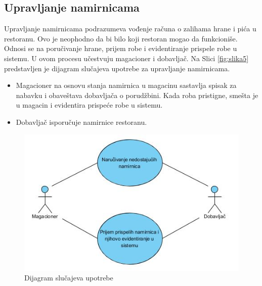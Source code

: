  \subsection{Upravljanje namirnicama}
 Upravljanje namirnicama podrazumeva vođenje računa o zalihama hrane i pića u restoranu. Ovo je neophodno da bi bilo koji restoran mogao da funkcioniše. Odnosi se na poručivanje hrane, prijem robe i evidentiranje prispele robe u sistemu. U ovom procesu učestvuju magacioner i dobavljač.
 Na Slici \ref{fig:slika5} predstavljen je dijagram slučajeva upotrebe za upravljanje namirnicama.
 
 \begin{itemize}
     \item Magacioner na osnovu stanja namirnica u magacinu sastavlja spisak za nabavku i obaveštava dobavljača o porudžbini. Kada roba pristigne, smešta je u magacin i evidentira prispeće robe u sistemu.
     \item Dobavljač isporučuje namirnice restoranu.
 \end{itemize}
\begin{figure}[!h]
    \leavevmode
    \begin{center}
    \includegraphics[width=1\textwidth]{slike/Upravljanje_namirnicama.JPG}
    \end{center}
    \caption{Dijagram slu\v cajeva upotrebe} %
    \label{fig:slika8}
\end{figure}

